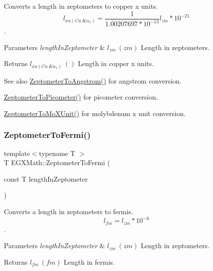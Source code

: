 Converts a length in zeptometers to copper x units. \[ l_{xu(Cu\ K\alpha_1)}= \frac{1}{1.00207697*10^{-13}} l_{zm} * 10^{-21}\]. 


\begin{DoxyParams}{Parameters}
{\em length\+In\+Zeptometer} & $ l_{zm}\ (zm)$ Length in zeptometers. \\
\hline
\end{DoxyParams}
\begin{DoxyReturn}{Returns}
$ l_{xu(Cu\ K\alpha_1)}\ ()$ Length in copper x units. 
\end{DoxyReturn}
\begin{DoxySeeAlso}{See also}
\mbox{\hyperlink{group___e_g_x_math-_conversions-_length_conversions-_zeptometer-_non-_s_i_gaa7023afd2a269dddf741cb4299803ef2}{Zeptometer\+To\+Angstrom()}} for angstrom conversion. 

\mbox{\hyperlink{group___e_g_x_math-_conversions-_length_conversions-_zeptometer-_s_i_gae7409493227692a85b7fa5016a007de3}{Zeptometer\+To\+Picometer()}} for picometer conversion. 

\mbox{\hyperlink{group___e_g_x_math-_conversions-_length_conversions-_zeptometer-_non-_s_i_gaa621a874847d7e6aae8d04395c68a313}{Zeptometer\+To\+Mo\+X\+Unit()}} for molybdenum x unit conversion. 
\end{DoxySeeAlso}
\mbox{\label{group___e_g_x_math-_conversions-_length_conversions-_zeptometer-_non-_s_i_ga15c5cde158a9916cc01d998c7abc38c4}} 
\subsubsection{\texorpdfstring{Zeptometer\+To\+Fermi()}{ZeptometerToFermi()}}
{\footnotesize\ttfamily template$<$typename T $>$ \\
T E\+G\+X\+Math\+::\+Zeptometer\+To\+Fermi (\begin{DoxyParamCaption}\item[{const T}]{length\+In\+Zeptometer }\end{DoxyParamCaption})}



Converts a length in zeptometers to fermis. \[ l_{fm}=l_{zm} * 10^{-6} \]. 


\begin{DoxyParams}{Parameters}
{\em length\+In\+Zeptometer} & $ l_{zm}\ (zm)$ Length in zeptometers. \\
\hline
\end{DoxyParams}
\begin{DoxyReturn}{Returns}
$ l_{fm}\ (fm)$ Length in fermis. 
\end{DoxyReturn}
\mbox{\label{group___e_g_x_math-_conversions-_length_conversions-_zeptometer-_non-_s_i_ga0bd42e8489b135f27530a247193286da}} 
